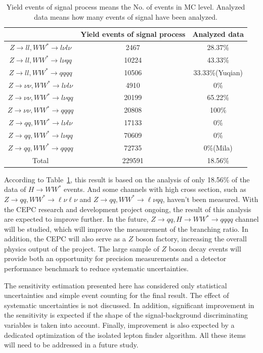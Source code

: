 \documentclass[11pt,a4paper]{cepcnote}
\begin{document}
\begin{table}[H]
	\begin{center}
		\begin{tabular}{c|c|c}
			\hline\hline
				&	Yield events of signal process	&	Analyzed data	\\
			\hline
			$Z\to ll, WW^*\to l\nu l\nu$	&	2467	&	28.37\%					\\
			$Z\to ll, WW^*\to l\nu qq$		&	10224	&	43.33\%					\\
			$Z\to ll, WW^*\to qqqq$			&	10506	&	33.33\%(Yuqian)			\\
			$Z\to \nu\nu, WW^*\to l\nu l\nu$&	4910	&	0\%						\\
			$Z\to \nu\nu, WW^*\to l\nu qq$	&	20199	&	65.22\%					\\
			$Z\to \nu\nu, WW^*\to qqqq$		&	20808	&	100\%					\\
			$Z\to qq, WW^*\to l\nu l\nu$	&	17133	&	0\%						\\
			$Z\to qq, WW^*\to l\nu qq$		&	70609	&	0\%						\\
			$Z\to qq, WW^*\to qqqq$			&	72735	&	0\%(Mila)				\\
			\hline
			Total	&	229591	&	18.56\%			\\
			\hline\hline
		\end{tabular}
	\caption[]{Yield events of signal process means the No. of events in MC level. Analyzed data means how many events of signal 
	have been analyzed. }
	\label{tab:AnalyzedData}
	\end{center}
\end{table}

According to Table~\ref{tab:AnalyzedData}, this result is based on the analysis of only 18.56\% of the data of $H\to WW^*$ events. 
And some channels with high cross section, 
such as $Z\to qq, WW^*\to \ell\nu \ell\nu$ and $Z\to qq, WW^*\to \ell\nu qq$, haven't been measured.
With the CEPC research and development project ongoing, the result of this analysis are expected to improve further.
In the future, $Z\rightarrow qq, H\rightarrow WW^*\rightarrow qqqq$ channel will be studied,
which will improve the measurement of the branching ratio. In addition, the CEPC will also serve as a $Z$ boson factory, 
increasing the overall physics output of the project. The large sample of $Z$ boson decay events will provide both an opportunity
for precision measurements and a detector performance benchmark to reduce systematic uncertainties.

The sensitivity  estimation presented here has considered only statistical
uncertainties and simple event counting for the final result.
The effect of systematic uncertainties is not discussed. In addition,
significant improvement in the sensitivity is expected if the shape of the signal-background
discriminating variables is taken into account. Finally, improvement is
also expected by a dedicated optimization of the isolated lepton finder
algorithm. All these items will need to be addressed in a future study.
\end{document}
